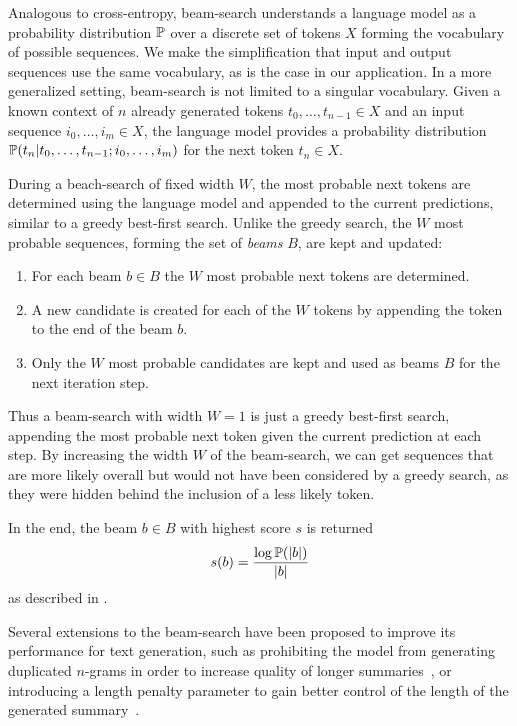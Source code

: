 Analogous to cross-entropy, beam-search understands a language model as a probability distribution \(\mathbb{P}\) over a
discrete set of tokens \(X\) forming the vocabulary of possible sequences.
We make the simplification that input and output sequences use the same vocabulary,
as is the case in our application.
In a more generalized setting, beam-search is not limited to a singular vocabulary.
Given a known context of \(n\) already generated tokens \(t_0, \ldots, t_{n-1} \in X\) and an input sequence \(i_0, \ldots, i_{m} \in X\),
the language model provides a probability distribution \(\mathbb{P}(t_n | t_0, \ldots, t_{n-1}; i_0, \ldots, i_{m})\) for the next token \(t_n \in X\).

During a beach-search of fixed width \(W\),
the most probable next tokens are determined
using the language model and appended to the current predictions,
similar to a greedy best-first search.
Unlike the greedy search, the \(W\) most probable sequences, forming the set of \emph{beams} \(B\), are kept and updated:
\begin{enumerate}
\item For each beam \(b \in B\) the \(W\) most probable next tokens are determined.
\item A new candidate is created for each of the \(W\) tokens by appending the token to the end of the beam \(b\).
\item Only the \(W\) most probable candidates are kept and used as beams \(B\) for the next iteration step.
\end{enumerate}
Thus a beam-search with width \(W = 1\) is just a greedy best-first search,
appending the most probable next token given the current prediction at each step.
By increasing the width \(W\) of the beam-search, we can get sequences that are more likely overall
but would not have been considered by a greedy search, as they were hidden behind the inclusion of a less likely token.

In the end, the beam \(b \in B\) with highest score \(s\) is returned
\begin{equation}
s(b) = \frac{\log \mathbb{P}(|b|)}{|b|}
\end{equation}
as described in \parencite[5]{beam_search}.

Several extensions to the beam-search have been proposed to improve its performance for text generation,
such as prohibiting the model from generating duplicated \(n\)-grams in order to increase quality of longer summaries~\parencite{beam_search_duplicate_ngram_removal},
or introducing a length penalty parameter to gain better control of the length of the generated summary~\parencite[12]{beam_search_length_penalty}.

